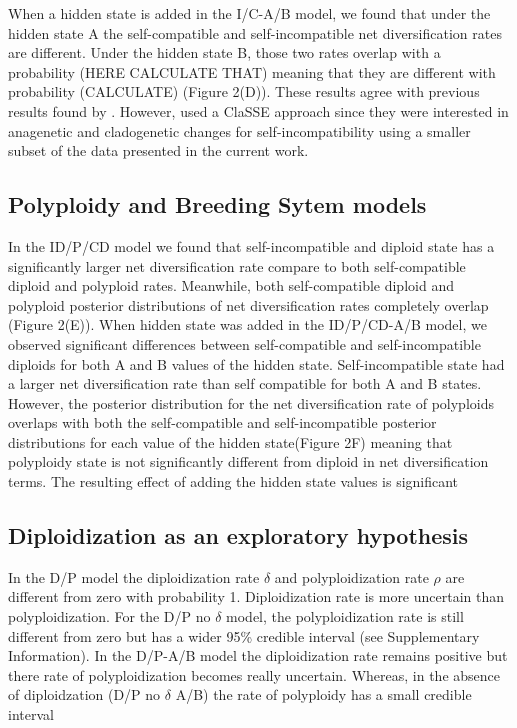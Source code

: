 When a hidden state is added in the I/C-A/B model, we found that under the hidden state A the self-compatible and self-incompatible net diversification rates are different. Under the hidden state B, those two rates overlap with a probability (HERE CALCULATE THAT) meaning that they are different with probability  (CALCULATE) (Figure 2(D)). These results agree with previous results found by  \citet{goldberg_2012}. However, \citet{goldberg_2012} used a ClaSSE  approach since they were interested in anagenetic and cladogenetic changes for self-incompatibility using a smaller subset of the data presented in the current work.


\subsection{Polyploidy and Breeding Sytem models}
In the ID/P/CD model we found that self-incompatible and diploid state has a significantly larger net diversification rate compare to both self-compatible diploid and polyploid rates. Meanwhile, both self-compatible diploid and polyploid posterior distributions of net diversification rates completely overlap (Figure 2(E)). When hidden state was added in the ID/P/CD-A/B model, we observed significant differences between self-compatible and self-incompatible diploids for both A and B values of the hidden state. Self-incompatible state had a larger net diversification rate than self compatible for both A and B states. However, the posterior distribution for the net diversification rate of polyploids overlaps with both the self-compatible and self-incompatible posterior distributions for each value of the hidden state(Figure 2F) meaning that polyploidy state is not significantly different from diploid in net diversification terms.  The resulting effect of adding the hidden state values is significant 


\subsection{Diploidization as an exploratory hypothesis}
In the D/P model  the diploidization rate $\delta$ and polyploidization rate $\rho$ are different from zero with probability 1. Diploidization rate is more uncertain than polyploidization. For the D/P no $\delta$ model, the polyploidization rate is still different from zero but has a wider 95\% credible interval (see Supplementary Information). In the D/P-A/B model the diploidization rate remains positive but there rate of polyploidization becomes really uncertain. Whereas, in the absence of diploidzation (D/P no $\delta$ A/B) the rate of polyploidy has a small credible interval \newline

